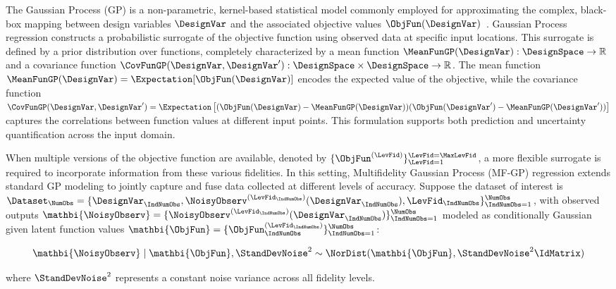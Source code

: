 The Gaussian Process (GP) is a non-parametric, kernel-based statistical model commonly employed for approximating the complex, black-box mapping between design variables $\DesignVar$ and the associated objective values $\ObjFun(\DesignVar)$~\cite{williams1995gaussian, schulz2018tutorial}. Gaussian Process regression constructs a probabilistic surrogate of the objective function using observed data at specific input locations. This surrogate is defined by a prior distribution over functions, completely characterized by a mean function $\MeanFunGP(\DesignVar) : \DesignSpace \rightarrow \mathbb{R}$ and a covariance function $\CovFunGP(\DesignVar, \DesignVar') : \DesignSpace \times \DesignSpace \rightarrow \mathbb{R}$. The mean function $\MeanFunGP(\DesignVar) = \Expectation[\ObjFun(\DesignVar)]$ encodes the expected value of the objective, while the covariance function $\CovFunGP(\DesignVar, \DesignVar') = \Expectation \left[ (\ObjFun(\DesignVar)-\MeanFunGP(\DesignVar))(\ObjFun(\DesignVar')-\MeanFunGP(\DesignVar')) \right]$ captures the correlations between function values at different input points. This formulation supports both prediction and uncertainty quantification across the input domain.

When multiple versions of the objective function are available, denoted by $\{\ObjFun^{(\LevFid)}\}_{\LevFid=1}^{\LevFid = \MaxLevFid}$, a more flexible surrogate is required to incorporate information from these various fidelities. In this setting, Multifidelity Gaussian Process (MF-GP) regression extends standard GP modeling to jointly capture and fuse data collected at different levels of accuracy. Suppose the dataset of interest is $\Dataset_{\NumObs} = \{ \DesignVar_{\IndNumObs}, \NoisyObserv^{(\LevFid_{\IndNumObs})}(\DesignVar_{\IndNumObs}), \LevFid_{\IndNumObs} \}_{\IndNumObs=1}^{\NumObs}$, with observed outputs $\mathbi{\NoisyObserv} = \{ \NoisyObserv^{(\LevFid_{\IndNumObs})}(\DesignVar_{\IndNumObs}) \}_{\IndNumObs=1}^{\NumObs}$ modeled as conditionally Gaussian given latent function values $\mathbi{\ObjFun} = \{ \ObjFun^{(\LevFid_{\IndNumObs})}_{\IndNumObs} \}_{\IndNumObs=1}^{\NumObs}$:

\begin{equation}\label{e:MFGP0}
    \mathbi{\NoisyObserv} \mid \mathbi{\ObjFun}, \StandDevNoise^2 \sim \NorDist(\mathbi{\ObjFun}, \StandDevNoise^2 \IdMatrix)
\end{equation}

\noindent where $\StandDevNoise^2$ represents a constant noise variance across all fidelity levels.

